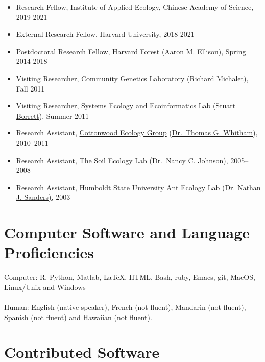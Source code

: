 \documentclass[a4paper]{article}
\begin{document}
\begin{itemize}
\item Research Fellow, Institute of Applied Ecology, Chinese Academy
  of Science, 2019-2021
\item External Research Fellow, Harvard University, 2018-2021
\item
  Postdoctoral Research Fellow, 
  \href{http://harvardforest.fas.harvard.edu/}{Harvard Forest}
  (\href{http://harvardforest.fas.harvard.edu/aaron-ellison}{Aaron M. Ellison}), Spring 2014-2018
\item
  Visiting Researcher,
  \href{https://www4.bordeaux-aquitaine.inra.fr/biogeco/}{Community
  Genetics Laboratory}
  (\href{http://www4.bordeaux-aquitaine.inra.fr/biogeco_eng/People/Former-members/Michalet-Richard}{Richard Michalet}), Fall 2011
\item
  Visiting Researcher, \href{http://people.uncw.edu/borretts/}{Systems
  Ecology and Ecoinformatics Lab}
  (\href{http://people.uncw.edu/borretts/people.html}{Stuart
  Borrett}), Summer 2011
\item
  Research Assistant, \href{http://www.poplar.nau.edu/}{Cottonwood
  Ecology Group}
  (\href{http://www.poplar.nau.edu/people.php?mode=showus\&user=tgw}{Dr.~Thomas
  G. Whitham}), 2010--2011
\item
  Research Assistant,
  \href{http://www.nau.edu/~envsci/johnsonlab/index.htm}{The Soil
  Ecology Lab}
  (\href{http://www.nau.edu/~envsci/johnsonlab/NCJ.htm}{Dr.~Nancy C.
  Johnson}), 2005--2008
\item
  Research Assistant, Humboldt State University Ant Ecology Lab
  \href{http://web.utk.edu/~nsanders/nate.html}{(Dr. Nathan J.
  Sanders)}, 2003
\end{itemize}

\section{Computer Software and Language
Proficiencies}\label{computer-software-and-language-proficiencies}

Computer: R, Python, Matlab, LaTeX, HTML, Bash, ruby, Emacs, git,
MacOS, Linux/Unix and Windows\\\\Human: English (native speaker),
French (not fluent), Mandarin (not fluent), Spanish (not fluent) and
Hawaiian (not fluent).




\section{Contributed Software}\label{contributed-software}
\end{document}

